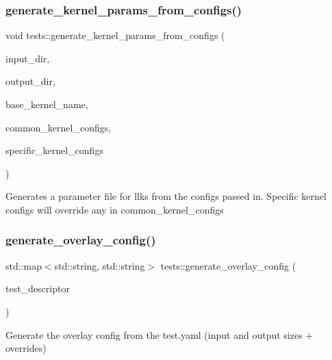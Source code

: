 \subsubsection{\texorpdfstring{generate\+\_\+kernel\+\_\+params\+\_\+from\+\_\+configs()}{generate\_kernel\_params\_from\_configs()}}
{\footnotesize\ttfamily void tests\+::generate\+\_\+kernel\+\_\+params\+\_\+from\+\_\+configs (\begin{DoxyParamCaption}\item[{std\+::string}]{input\+\_\+dir,  }\item[{std\+::string}]{output\+\_\+dir,  }\item[{std\+::string}]{base\+\_\+kernel\+\_\+name,  }\item[{std\+::map$<$ std\+::string, std\+::string $>$ \&}]{common\+\_\+kernel\+\_\+configs,  }\item[{std\+::map$<$ std\+::string, std\+::string $>$ \&}]{specific\+\_\+kernel\+\_\+configs }\end{DoxyParamCaption})}

Generates a parameter file for llks from the configs passed in. Specific kernel configs will override any in common\+\_\+kernel\+\_\+configs \mbox{\label{namespacetests_a52d1d4bec489c7f42a6c5fe9250cdbf8}} 
\subsubsection{\texorpdfstring{generate\+\_\+overlay\+\_\+config()}{generate\_overlay\_config()}}
{\footnotesize\ttfamily std\+::map$<$std\+::string, std\+::string$>$ tests\+::generate\+\_\+overlay\+\_\+config (\begin{DoxyParamCaption}\item[{Y\+A\+M\+L\+::\+Node \&}]{test\+\_\+descriptor }\end{DoxyParamCaption})}



Generate the overlay config from the test.\+yaml (input and output sizes + overrides) 

\mbox{\label{namespacetests_ae7885014fe584723c6327a6d05713708}} 
